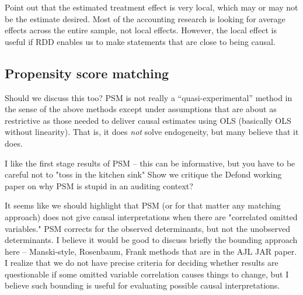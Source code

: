 \documentclass[11pt]{amsart}
\begin{document}

Point out that the estimated treatment effect is very local, which may or may not be the estimate desired.  Most of the accounting research is looking for average effects across the entire sample, not local effects.  However, the local effect is useful if RDD enables us to make statements that are close to being causal.





\subsection{Propensity score matching}

Should we discuss this too? PSM is not really a ``quasi-experimental'' method in the sense of the above methods except under assumptions that are about as restrictive as those needed to deliver causal estimates using OLS (basically OLS without linearity). That is, it does \emph{not} solve endogeneity, but many believe that it does.

I like the first stage results of PSM -- this can be informative, but you have to be careful not to "toss in the kitchen sink"  Show we critique the Defond working paper on why PSM is stupid in an auditing context?

It seems like we should highlight that PSM (or for that matter any matching approach) does not give causal interpretations when there are "correlated omitted variables."  PSM corrects for the observed determinants, but not the unobserved determinants.  I believe it would be good to discuss briefly the bounding approach here -- Manski-style, Rosenbaum, Frank methods that are in the AJL JAR paper.  I realize that we do not have precise criteria for deciding whether results are questionable if some omitted variable correlation causes things to change, but I believe such bounding is useful for evaluating possible causal interpretations.
\end{document}
